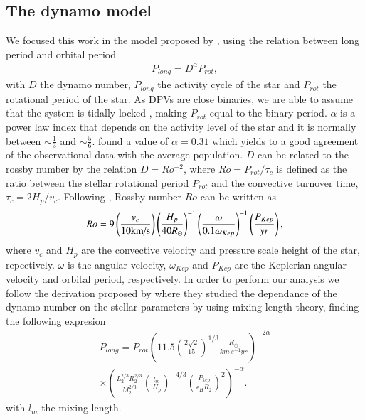 \subsection{The dynamo model}

We focused this work in the model proposed by \citet{schleicher2017}, using the relation between long period and orbital period \citep{soon1993, baliunas1996}
\begin{eqnarray}
P_{long}=D^{\alpha}P_{rot},
\end{eqnarray}
with $D$ the dynamo number, $P_{long}$ the activity cycle of the star and $P_{rot}$ the rotational period of the star. As DPVs are close binaries, we are able to assume that the system is tidally locked \citep{zahn1989, zahnbouchet1989}, making $P_{rot}$ equal to the binary period. $\alpha$ is a power law index that depends on the activity level of the star \citep{dube2013} and it is normally between $\sim \frac{1}{3}$ and $\sim \frac{5}{6}$. \citet{schleicher2017} found a value of $\alpha=0.31$ which yields to a good agreement of the observational data with the average population.  $D$ can be related to the rossby number by the relation $D=Ro^{-2}$, where $Ro=P_{rot}/\tau_{c}$ is defined as the ratio between the stellar rotational period $P_{rot}$ and the convective turnover time, $\tau_{c}=2H_{p}/v_{c}$. Following \citet{soker2000}, Rossby number $Ro$ can be written as
\begin{eqnarray}
Ro=9\left(\frac{v_{c}}{10\textnormal{km/s}}\right)\left(\frac{H_{p}}{40R_{\odot}}\right)^{-1}\left(\frac{\omega}{0.1\omega_{Kep}}\right)^{-1}\left(\frac{P_{Kep}}{yr}\right),
\end{eqnarray}
where $v_{c}$ and $H_{p}$ are the convective velocity and pressure scale height of the star, repectively. $\omega$ is the angular velocity, $\omega_{Kep}$ and $P_{Kep}$ are the Keplerian angular velocity and orbital period, respectively. In order to perform our analysis we follow the derivation proposed by \citet{schleicher2017} where they studied the dependance of the dynamo number on the stellar parameters by using mixing length theory, finding the following expresion
\begin{eqnarray}
P_{long}=P_{rot}\left(11.5\left(\frac{2\sqrt{2}}{15}\right)^{1/3}\frac{R_{\odot}}{km\, s^{-1}yr}\right)^{-2\alpha}\\ \nonumber
\times\left(\frac{L_{2}^{2/3}R_{2}^{2/3}}{M_{2}^{2/3}}\left(\frac{l_{m}}{H_{p}}\right)^{-4/3}\left(\frac{P_{kep}}{\epsilon_{H}R_{2}}\right)^{2}\right)^{-\alpha}.
\end{eqnarray}
with $l_{m}$ the mixing length.


